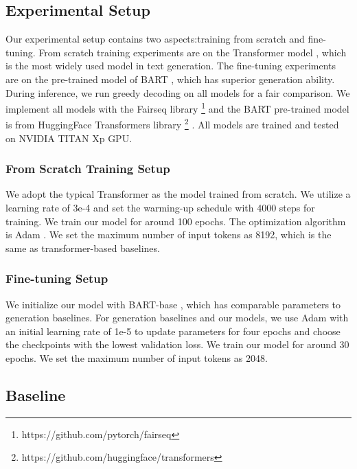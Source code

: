 \documentclass[11pt]{article}
\begin{document}
\subsection{Experimental Setup}
Our experimental setup contains two aspects:training from scratch and fine-tuning. From scratch training experiments are on the Transformer model \cite{Transformer}, which is the most widely used model in text generation. The fine-tuning experiments are on the pre-trained model of BART \cite{lewis2019bart}, which has superior generation ability. During inference, we run greedy decoding on all models for a fair comparison. We implement all models with the Fairseq library \footnote{https://github.com/pytorch/fairseq} and the BART pre-trained model is from HuggingFace Transformers library \footnote{https://github.com/huggingface/transformers} \cite{wolf2019huggingface}. All models are trained and tested on NVIDIA TITAN Xp GPU.

\subsubsection{From Scratch Training Setup}
We adopt the typical Transformer \cite{Transformer} as the model trained from scratch. We utilize a learning rate of 3e-4 and set the warming-up schedule with 4000 steps for training. We train our model for around 100 epochs. The optimization algorithm is Adam \cite{kingma2014adam}. We set the maximum number of input tokens as 8192, which is the same as transformer-based baselines. 
\subsubsection{Fine-tuning Setup}
We initialize our model with BART-base \cite{lewis2019bart}, which has comparable parameters to generation baselines. For generation baselines and our models, we use Adam \cite{kingma2014adam} with an initial learning rate of 1e-5 to update parameters for four epochs and choose the checkpoints with the lowest validation loss. We train our model for around 30 epochs. We set the maximum number of input tokens as 2048. 



\subsection{Baseline} \label{baselines}
\end{document}
